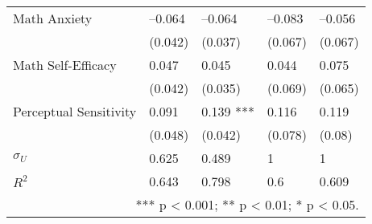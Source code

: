 \begin{tabular}{lllll}
  Math Anxiety & --0.064 & --0.064 & --0.083 & --0.056 \\ 
   & (0.042) & (0.037) & (0.067) & (0.067) \\ 
  Math Self-Efficacy & 0.047 & 0.045 & 0.044 & 0.075 \\ 
   & (0.042) & (0.035) & (0.069) & (0.065) \\ 
  Perceptual Sensitivity & 0.091 & 0.139 *** & 0.116 & 0.119 \\ 
   & (0.048) & (0.042) & (0.078) & (0.08) \\ 
   \hline
$\sigma_U$ & 0.625 & 0.489 & 1 & 1 \\ 
  $R^2$ & 0.643 & 0.798 & 0.6 & 0.609 \\ 
   \hline
\multicolumn{5}{r}{  *** p < 0.001;  ** p < 0.01;  * p < 0.05. } &  &  &  &  \\ 
  \end{tabular}
